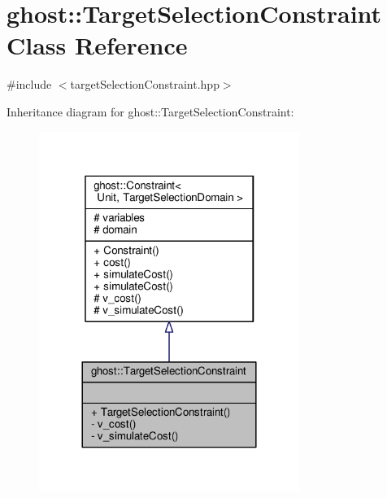 \hypertarget{classghost_1_1TargetSelectionConstraint}{\section{ghost\-:\-:Target\-Selection\-Constraint Class Reference}
\label{classghost_1_1TargetSelectionConstraint}
}


{\ttfamily \#include $<$target\-Selection\-Constraint.\-hpp$>$}



Inheritance diagram for ghost\-:\-:Target\-Selection\-Constraint\-:
\nopagebreak
\begin{figure}[H]
\begin{center}
\leavevmode
\includegraphics[width=240pt]{classghost_1_1TargetSelectionConstraint__inherit__graph}
\end{center}
\end{figure}


